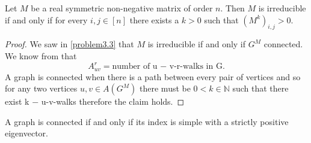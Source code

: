 \documentclass[a4paper, 11pt, oneside]{article}
\newenvironment{problem}[1]
  {\renewcommand\theinnercustomprob{#1}\innercustomprob}
  {\endinnercustomprob}
\newcommand{\N}{\mathbb{N}}
\begin{document}
\begin{problem}{3.4}\label{problem3.4}
Let $M$ be a real symmetric non-negative matrix of order $n$. Then $M$ is irreducible if and only if for every $i,j\in [n]$ there exists a $k > 0$ such that $(M^k)_{i,j}>0$.
\end{problem}

\begin{proof}
We saw in \ref{problem3.3} that $M$ is irreducible if and only if $G^M$ connected. 
We know from \cite[Lemma 1]{basic_info_spec} that 
\begin{equation*}
A^r_{uv} = \text{number of u − v-r-walks in G}. 
\end{equation*}
A graph is connected when there is a path between every pair of vertices \cite{connectivity} and so for any two vertices $u, v \in A(G^M)$ there must be $0 < k \in \N$  such that there exist k − u-v-walks therefore the claim holds.
\end{proof}

\begin{problem}{3.5}\label{problem3.5}
A graph is connected if and only if its index is simple with a strictly positive eigenvector.
\end{problem}
\end{document}
